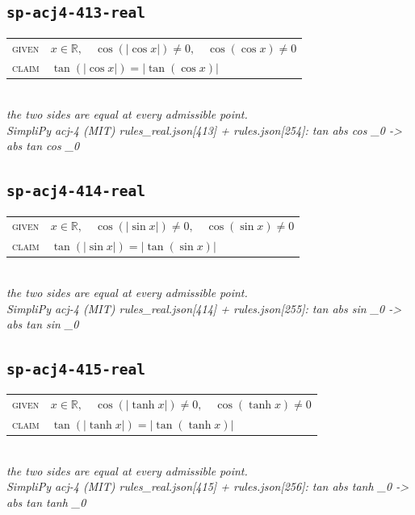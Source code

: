 \documentclass[11pt]{article}
\begin{document}
\subsection*{\texttt{sp-acj4-413-real}}
\begin{tabular}{@{}l@{\quad}l@{}}
\textsc{given} & $x \in \mathbb{R},\quad \cos\left(\left|\cos x\right|\right) \neq 0,\quad \cos\left(\cos x\right) \neq 0$ \\[4pt]
\textsc{claim} & $\displaystyle \tan\left(\left|\cos x\right|\right) = \left|\tan\left(\cos x\right)\right|$ \\
\end{tabular}\\[2pt]
{\small\emph{the two sides are equal at every admissible point.}}\\
\emph{SimpliPy acj-4 (MIT) rules\_real.json[413] + rules.json[254]: tan abs cos \_0  ->  abs tan cos \_0}\\

\subsection*{\texttt{sp-acj4-414-real}}
\begin{tabular}{@{}l@{\quad}l@{}}
\textsc{given} & $x \in \mathbb{R},\quad \cos\left(\left|\sin x\right|\right) \neq 0,\quad \cos\left(\sin x\right) \neq 0$ \\[4pt]
\textsc{claim} & $\displaystyle \tan\left(\left|\sin x\right|\right) = \left|\tan\left(\sin x\right)\right|$ \\
\end{tabular}\\[2pt]
{\small\emph{the two sides are equal at every admissible point.}}\\
\emph{SimpliPy acj-4 (MIT) rules\_real.json[414] + rules.json[255]: tan abs sin \_0  ->  abs tan sin \_0}\\

\subsection*{\texttt{sp-acj4-415-real}}
\begin{tabular}{@{}l@{\quad}l@{}}
\textsc{given} & $x \in \mathbb{R},\quad \cos\left(\left|\tanh x\right|\right) \neq 0,\quad \cos\left(\tanh x\right) \neq 0$ \\[4pt]
\textsc{claim} & $\displaystyle \tan\left(\left|\tanh x\right|\right) = \left|\tan\left(\tanh x\right)\right|$ \\
\end{tabular}\\[2pt]
{\small\emph{the two sides are equal at every admissible point.}}\\
\emph{SimpliPy acj-4 (MIT) rules\_real.json[415] + rules.json[256]: tan abs tanh \_0  ->  abs tan tanh \_0}\\
\end{document}
